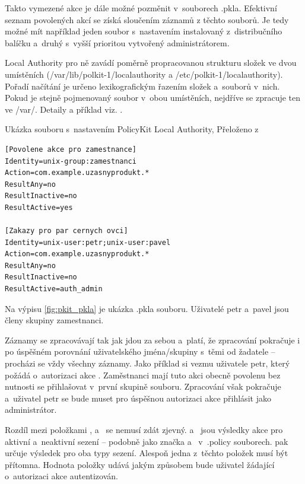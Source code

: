 Takto vymezené akce je dále možné pozměnit v~souborech .pkla. Efektivní seznam povolených akcí se získá sloučením záznamů z těchto souborů. Je tedy možné mít například jeden soubor s~nastavením instalovaný z~distribučního balíčku a~druhý s~vyšší prioritou vytvořený administrátorem.

Local Authority pro ně zavádí poměrně propracovanou strukturu složek ve dvou umístěních (/var/lib/polkit-1/localauthority a /etc/polkit-1/localauthority). Pořadí načítání je určeno lexikografickým řazením složek a~souborů v~nich. Pokud je stejně pojmenovaný soubor v~obou umístěních, nejdříve se zpracuje ten ve /var/. Detaily a příklad viz. \cite{manpklocalauth}.

\begin{mylisting}
\caption{Ukázka souboru s~nastavením PolicyKit Local Authority, Přeloženo z~\cite{manpklocalauth}}
\label{fig:pkit_pkla}
\begin{lstlisting}
[Povolene akce pro zamestnance]
Identity=unix-group:zamestnanci
Action=com.example.uzasnyprodukt.*
ResultAny=no
ResultInactive=no
ResultActive=yes

[Zakazy pro par cernych ovci]
Identity=unix-user:petr;unix-user:pavel
Action=com.example.uzasnyprodukt.*
ResultAny=no
ResultInactive=no
ResultActive=auth_admin
\end{lstlisting}
\end{mylisting}

Na výpisu \ref{fig:pkit_pkla} je ukázka .pkla souboru. Uživatelé petr a~pavel jsou členy skupiny zamestnanci.

Záznamy se zpracovávají tak jak jdou za sebou a~platí, že zpracování pokračuje i po úspěšném porovnání uživatelského jména/skupiny s~těmi od žadatele -- procházi se vždy všechny záznamy. Jako příklad si vezmu uživatele petr, který požádá o~autorizaci akce . Zaměstnanci mají tuto akci obecně povolenu bez nutnosti se přihlašovat v~první skupině souboru. Zpracování však pokračuje a~uživatel petr se bude muset pro úspěšnou autorizaci akce přihlásit jako administrátor.

Rozdíl mezi položkami ,  a~ se nemusí zdát zjevný.  a~ jsou výsledky akce pro aktivní a~neaktivní sezení -- podobně jako značka  a~ v~.policy souborech.  pak určuje výsledek pro oba typy sezení. Alespoň jedna z~těchto položek musí být přítomna. Hodnota položky udává jakým způsobem bude uživatel žádající o~autorizaci akce autentizován.

